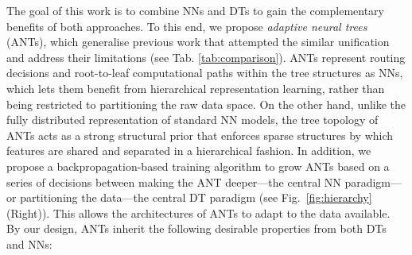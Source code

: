 The goal of this work is to combine NNs and DTs to gain the complementary benefits of both approaches. To this end, we propose \textit{adaptive neural trees} (ANTs), which generalise previous work that attempted the similar unification \cite{suarez1999globally,irsoy2012soft,laptev2014convolutional,rota2014neural,kontschieder2015deep,frosst2017distilling,xiao2017ndt} and address their limitations (see Tab. \ref{tab:comparison}). 
ANTs represent routing decisions and root-to-leaf computational paths within the tree structures as NNs, which lets them benefit from hierarchical representation learning, rather than being restricted to partitioning the raw data space. On the other hand, unlike the fully distributed representation of standard NN models, the tree topology of ANTs acts as a strong structural prior that enforces sparse structures by which features are shared and separated in a hierarchical fashion. In addition, we propose a backpropagation-based training algorithm to grow ANTs based on a series of decisions between making the ANT deeper---the central NN paradigm---or partitioning the data---the central DT paradigm (see Fig.~\ref{fig:hierarchy} (Right)). This allows the architectures of ANTs to adapt to the data available. By our design, ANTs inherit the following desirable properties from both DTs and NNs:


